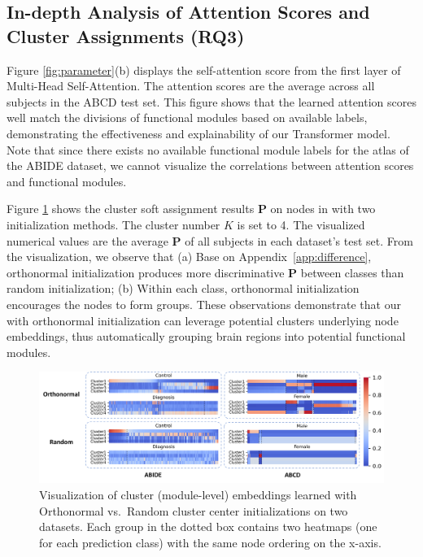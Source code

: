 \subsection{In-depth Analysis of Attention Scores and Cluster Assignments (RQ3)}
Figure \ref{fig:parameter}(b) displays the self-attention score from the first layer of Multi-Head Self-Attention. The attention scores are the average across all subjects in the ABCD test set. This figure shows that the learned attention scores well match the divisions of functional modules based on available labels, demonstrating the effectiveness and explainability of our Transformer model. Note that since there exists no available functional module labels for the atlas of the ABIDE dataset, we cannot visualize the correlations between attention scores and functional modules.

Figure \ref{fig:soft_att} shows the cluster soft assignment results $\bm P$ on nodes in \poolingshort with two initialization methods. The cluster number $K$ is set to 4. The visualized numerical values are the average $\bm P$ of all subjects in each dataset's test set. From the visualization, we observe that (a) Base on Appendix~\ref{app:difference}, orthonormal initialization produces more discriminative $\bm P$ between classes than random initialization; (b) Within each class, orthonormal initialization encourages the nodes to form groups. These observations demonstrate that our \poolingshort with orthonormal initialization can leverage potential clusters underlying node embeddings, thus automatically grouping brain regions into potential functional modules. 

\begin{figure}[h]
    \centering
    \includegraphics[width=0.9\linewidth]{figures/soft2.pdf}
    \caption{Visualization of cluster (module-level) embeddings learned with Orthonormal vs.~Random cluster center initializations on two datasets.  Each group in the dotted box contains two heatmaps (one for each prediction class) with the same node ordering on the x-axis.}
    \label{fig:soft_att}
\end{figure}
